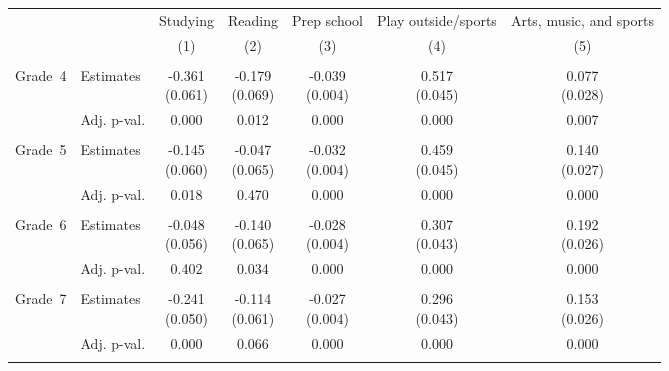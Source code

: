 \begin{tabular}{llccccc}
\hline \hline 
 &  & Studying & Reading & Prep school & Play outside/sports & Arts, music, and sports \\
 &  & (1) & (2) & (3) & (4) & (5) \\
\hline 
 &  &  &  &  &  &  \\
Grade~4 & Estimates & \makecell[tc]{-0.361\\(0.061)} & \makecell[tc]{-0.179\\(0.069)} & \makecell[tc]{-0.039\\(0.004)} & \makecell[tc]{0.517\\(0.045)} & \makecell[tc]{0.077\\(0.028)} \\
 & Adj. p-val. & 0.000 & 0.012 & 0.000 & 0.000 & 0.007 \\
  \\
Grade~5 & Estimates & \makecell[tc]{-0.145\\(0.060)} & \makecell[tc]{-0.047\\(0.065)} & \makecell[tc]{-0.032\\(0.004)} & \makecell[tc]{0.459\\(0.045)} & \makecell[tc]{0.140\\(0.027)} \\
 & Adj. p-val. & 0.018 & 0.470 & 0.000 & 0.000 & 0.000 \\
  \\
Grade~6 & Estimates & \makecell[tc]{-0.048\\(0.056)} & \makecell[tc]{-0.140\\(0.065)} & \makecell[tc]{-0.028\\(0.004)} & \makecell[tc]{0.307\\(0.043)} & \makecell[tc]{0.192\\(0.026)} \\
 & Adj. p-val. & 0.402 & 0.034 & 0.000 & 0.000 & 0.000 \\
  \\
Grade~7 & Estimates & \makecell[tc]{-0.241\\(0.050)} & \makecell[tc]{-0.114\\(0.061)} & \makecell[tc]{-0.027\\(0.004)} & \makecell[tc]{0.296\\(0.043)} & \makecell[tc]{0.153\\(0.026)} \\
 & Adj. p-val. & 0.000 & 0.066 & 0.000 & 0.000 & 0.000 \\
  \\

\end{tabular}
